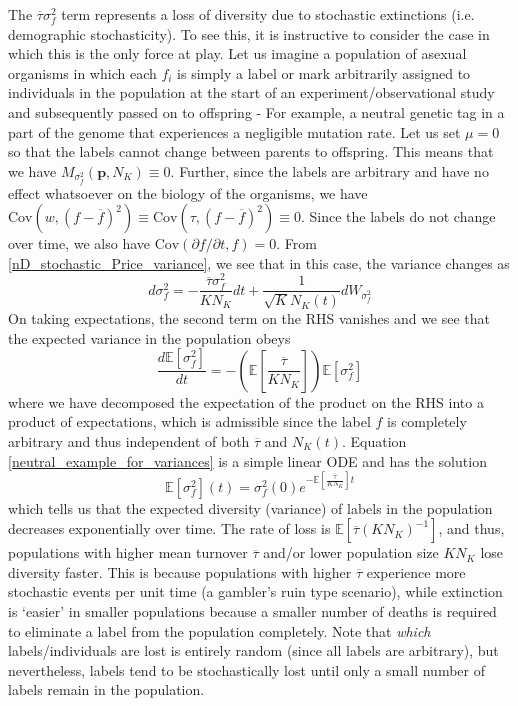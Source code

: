 The $\overline{\tau}\sigma^2_{f}$ term represents a loss of diversity due to stochastic extinctions (i.e. demographic stochasticity). To see this, it is instructive to consider the case in which this is the only force at play. Let us imagine a population of asexual organisms in which each $f_i$ is simply a label or mark arbitrarily assigned to individuals in the population at the start of an experiment/observational study and subsequently passed on to offspring - For example, a neutral genetic tag in a part of the genome that experiences a negligible mutation rate. Let us set $\mu = 0$ so that the labels cannot change between parents to offspring. This means that we have $M_{\sigma^2_f}(\mathbf{p},N_K) \equiv 0$. Further, since the labels are arbitrary and have no effect whatsoever on the biology of the organisms, we have $\textrm{Cov}\left(w,(f - \overline{f})^2\right) \equiv \textrm{Cov}\left(\tau,(f - \overline{f})^2\right) \equiv 0$. Since the labels do not change over time, we also have $\textrm{Cov}\left(\partial f/\partial t,f\right) = 0$. From \eqref{nD_stochastic_Price_variance}, we see that in this case, the variance changes as
\begin{equation}
d\sigma^2_f = - \frac{\overline{\tau}\sigma^2_{f}}{KN_K}dt + \frac{1}{\sqrt{K}N_{K}(t)}dW_{\sigma^2_{f}}
\end{equation}
On taking expectations, the second term on the RHS vanishes and we see that the expected variance in the population obeys
\begin{equation}
\label{neutral_example_for_variances}
\frac{d \mathbb{E}[\sigma^2_f]}{dt} = - \left(\mathbb{E}\left[\frac{\overline{\tau}}{KN_K}\right]\right)\mathbb{E}[\sigma^2_{f}]
\end{equation}
where we have decomposed the expectation of the product on the RHS into a product of expectations, which is admissible since the label $f$ is completely arbitrary and thus independent of both $\overline{\tau}$ and $N_K(t)$. Equation \eqref{neutral_example_for_variances} is a simple linear ODE and has the solution
\begin{equation}
\mathbb{E}[\sigma^2_f](t) = \sigma^2_f(0)e^{-\mathbb{E}\left[\frac{\overline{\tau}}{KN_K}\right]t}
\end{equation}
which tells us that the expected diversity (variance) of labels in the population decreases exponentially over time. The rate of loss is $\mathbb{E}\left[\overline{\tau}(KN_K)^{-1}\right]$, and thus, populations with higher mean turnover $\overline{\tau}$  and/or lower population size $KN_K$ lose diversity faster. This is because populations with higher $\overline{\tau}$ experience more stochastic events per unit time (a gambler's ruin type scenario), while extinction is `easier' in smaller populations because a smaller number of deaths is required to eliminate a label from the population completely. Note that \emph{which} labels/individuals are lost is entirely random (since all labels are arbitrary), but nevertheless, labels tend to be stochastically lost until only a small number of labels remain in the population.

